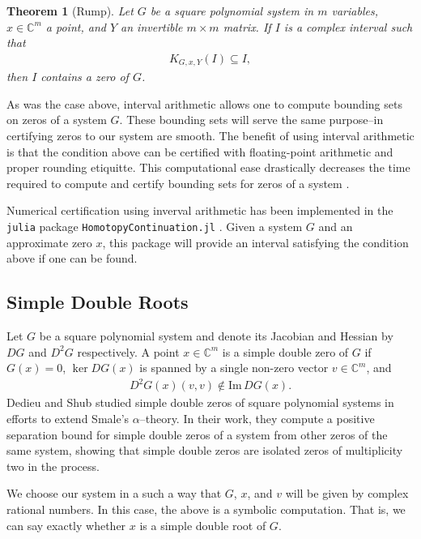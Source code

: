 \documentclass[12pt]{amsart}
\newtheorem{theorem}{Theorem}
\theoremstyle{definition}
\newcommand{\defcolor}[1]{{\color{RoyalBlue}#1}}
\begin{document}
\begin{theorem}[Rump]
Let $G$ be a square polynomial system in $m$ variables, $x\in\mathbb{C}^m$ a point, and $Y$ an invertible $m\times m$ matrix. If $I$ is a complex interval such that
\begin{align*}
K_{G,x,Y}(I)\subseteq I,
\end{align*}
then $I$ contains a zero of $G$.
\end{theorem}

As was the case above, interval arithmetic allows one to compute bounding sets on zeros of a system $G$. These bounding sets will serve the same purpose--in certifying zeros to our system are smooth. The benefit of using interval arithmetic is that the condition above can be certified with floating-point arithmetic and proper rounding etiquitte. This computational ease drastically decreases the time required to compute and certify bounding sets for zeros of a system \cite{BRT}.

Numerical certification using inverval arithmetic has been implemented in the \texttt{julia} package \texttt{HomotopyContinuation.jl} \cite{HCJL}. Given a system $G$ and an approximate zero $x$, this package will provide an interval satisfying the condition above if one can be found. 

\subsection*{Simple Double Roots}
Let $G$ be a square polynomial system and denote its Jacobian and Hessian by $DG$ and $D^2G$ respectively. A point $x\in\mathbb{C}^m$ is a \defcolor{simple double zero} of $G$ if $G(x)=0$, $\ker DG(x)$ is spanned by a single non-zero vector $v\in\mathbb{C}^m$, and
\begin{align*}
D^2G(x)(v,v)\not\in\text{Im}\,DG(x).
\end{align*}
Dedieu and Shub studied simple double zeros of square polynomial systems in efforts to extend Smale's $\alpha$--theory. In their work, they compute a positive separation bound for simple double zeros of a system from other zeros of the same system, showing that simple double zeros are isolated zeros of multiplicity two in the process. 

We choose our system in a such a way that $G$, $x$, and $v$ will be given by complex rational numbers. In this case, the above is a symbolic computation. That is, we can say exactly whether $x$ is a simple double root of $G$.
\end{document}
